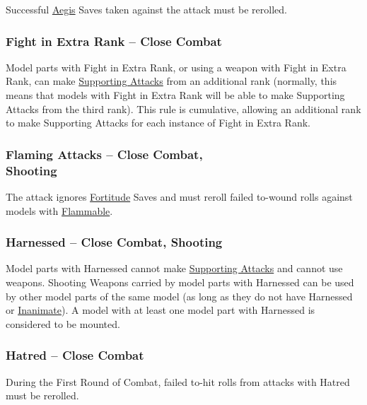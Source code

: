 Successful \hyperref[aegis]{Aegis} Saves taken against the attack must be rerolled.

\subsubsection{Fight in Extra Rank -- Close Combat}
\idx[main=y]{\fightinextrarank}\label{fight_in_extra_rank}

Model parts with Fight in Extra Rank, or using a weapon with Fight in Extra Rank, can make \hyperref[supporting_attacks]{Supporting Attacks} from an additional rank (normally, this means that models with Fight in Extra Rank will be able to make Supporting Attacks from the third rank). This rule is cumulative, allowing an additional rank to make Supporting Attacks for each instance of Fight in Extra Rank.

\subsubsection[Flaming Attacks -- Close Combat, Shooting]{Flaming Attacks -- Close Combat,\\ Shooting}
\idx[main=y]{\flamingattacks}\label{flaming_attacks}

The attack ignores \hyperref[fortitude]{Fortitude} Saves and must reroll failed to-wound rolls against models with \hyperref[flammable]{Flammable}.

\subsubsection{Harnessed -- Close Combat, Shooting}
\idx[main=y]{\harnessed}\label{harnessed}

Model parts with Harnessed cannot make \hyperref[supporting_attacks]{Supporting Attacks} and cannot use weapons. Shooting Weapons carried by model parts with Harnessed can be used by other model parts of the same model (as long as they do not have Harnessed or \hyperref[inanimate]{Inanimate}). A model with at least one model part with Harnessed is considered to be mounted.

\subsubsection{Hatred -- Close Combat}
\idx[main=y]{\hatred}\label{hatred}

During the First Round of Combat, failed to-hit rolls from attacks with Hatred must be rerolled.

